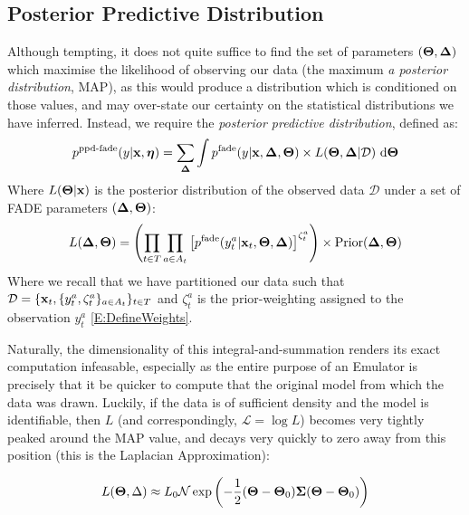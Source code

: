 
\subsection{Posterior Predictive Distribution}
	\def\vD{\vec{\Delta}}
	Although tempting, it does not quite suffice to find the set of parameters $(\vT, \vD)$ which maximise the likelihood of observing our data (the maximum \textit{a posterior distribution}, MAP), as this would produce a distribution which is conditioned on those values, and may over-state our certainty on the statistical distributions we have inferred. Instead, we require the \textit{posterior predictive distribution}, defined as:
	\begin{equation}
		p^\text{ppd-fade}(y | \mathbf{\boldsymbol{\mathrm{x}}}, \mathbf{\boldsymbol{\mathrm{\eta}}}) = \sum_{\mathbf{\boldsymbol{\mathrm{\Delta}}}} \int p^\text{fade}(y | \mathbf{\boldsymbol{\mathrm{x}}}, \mathbf{\boldsymbol{\mathrm{\Delta}}}, \mathbf{\boldsymbol{\mathrm{\Theta}}}) \times L(\mathbf{\boldsymbol{\mathrm{\Theta}}}, \mathbf{\boldsymbol{\mathrm{\Delta}}} | \mathcal{D})~ \mathrm d \mathbf{\boldsymbol{\mathrm{\Theta}}}
	\end{equation}
	Where $L(\mathbf{\boldsymbol{\mathrm{\Theta}}} | \mathbf{\boldsymbol{\mathrm{x}}})$ is the posterior distribution of the observed data $\mathcal{D}$ under a set of FADE parameters $(\mathbf{\boldsymbol{\mathrm{\Delta}}}, \mathbf{\boldsymbol{\mathrm{\Theta}}})$:
	\begin{equation}
		L(\mathbf{\boldsymbol{\mathrm{\Delta}}},\mathbf{\boldsymbol{\mathrm{\Theta}}}) = \left(\prod_{t \in T} \prod_{a \in A_t} \left[p^\text{fade}(y_t^a | \mathbf{\boldsymbol{\mathrm{x}}}_t, \mathbf{\boldsymbol{\mathrm{\Theta}}}, \mathbf{\boldsymbol{\mathrm{\Delta}}})\right]^{\zeta_t^a}\right) \times \text{Prior}(\mathbf{\boldsymbol{\mathrm{\Delta}}}, \mathbf{\boldsymbol{\mathrm{\Theta}}})
	\end{equation}
	Where we recall that we have partitioned our data such that $\mathcal{D} = \{\mathbf{\boldsymbol{\mathrm{x}}}_t, \{y_t^a, \zeta_t^a\}_{a \in A_t} \}_{t \in T}$ and $\zeta_t^a$ is the prior-weighting assigned to the observation $y_t^a$ \eqref{E:DefineWeights}.

	Naturally, the dimensionality of this integral-and-summation renders its exact computation infeasable, especially as the entire purpose of an Emulator is precisely that it be quicker to compute that the original model from which the data was drawn. Luckily, if the data is of sufficient density and the model is identifiable, then $L$ (and correspondingly, $\mathcal{L} = \log L$) becomes very tightly peaked around the MAP value, and decays very quickly to zero away from this position (this is the Laplacian Approximation):

	\begin{equation}
		L(\mathbf{\boldsymbol{\mathrm{\Theta}}}, \Delta) \approx L_0 \mathcal{N}\exp\left(-\frac{1}{2} (\mathbf{\boldsymbol{\mathrm{\Theta}}} - \mathbf{\boldsymbol{\mathrm{\Theta}}}_0) \mathbf{\boldsymbol{\mathrm{\Sigma}}} (\mathbf{\boldsymbol{\mathrm{\Theta}}} - \mathbf{\boldsymbol{\mathrm{\Theta}}}_0)\right)
	\end{equation}

